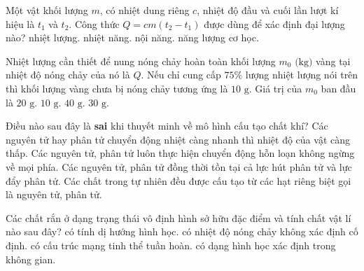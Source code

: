 \begin{ex}%
	Một vật khối lượng $m$, có nhiệt dung riêng $c$, nhiệt độ đầu và cuối lần lượt kí hiệu là $t_1$ và $t_2$. Công thức $Q=cm(t_2-t_1)$ được dùng để xác định đại lượng nào?
	\choice
	{\True nhiệt lượng.}
	{nhiệt năng.}
	{nội năng.}
	{năng lượng cơ học.}
\end{ex}

\begin{ex}%
	Nhiệt lượng cần thiết để nung nóng chảy hoàn toàn khối lượng $m_0\text{ (kg)}$ vàng tại nhiệt độ nóng chảy của nó là $Q$. Nếu chỉ cung cấp $75\%$ lượng nhiệt lượng nói trên thì khối lượng vàng chưa bị nóng chảy tương ứng là $10\text{ g}$. Giá trị của $m_0$ ban đầu là
	\choice
	{$20\text{ g}$.}
	{$10\text{ g}$.}
	{\True $40\text{ g}$.}
	{$30\text{ g}$.}
\end{ex}

\begin{ex}%
	Điều nào sau đây là \textbf{sai} khi thuyết minh về mô hình cấu tạo chất khí?
	\choice
	{\True Các nguyên tử hay phân tử chuyển động nhiệt càng nhanh thì nhiệt độ của vật càng thấp.}
	{Các nguyên tử, phân tử luôn thực hiện chuyển động hỗn loạn không ngừng về mọi phía.}
	{Các nguyên tử, phân tử đồng thời tồn tại cả lực hút phân tử và lực đẩy phân tử.}
	{Các chất trong tự nhiên đều được cấu tạo từ các hạt riêng biệt gọi là nguyên tử, phân tử.}
\end{ex}

\begin{ex}%
	Các chất rắn ở dạng trạng thái vô định hình sở hữu đặc điểm và tính chất vật lí nào sau đây?
	\choice
	{có tính dị hướng hình học.}
	{\True có nhiệt độ nóng chảy không xác định cố định.}
	{có cấu trúc mạng tinh thể tuần hoàn.}
	{có dạng hình học xác định trong không gian.}
\end{ex}

